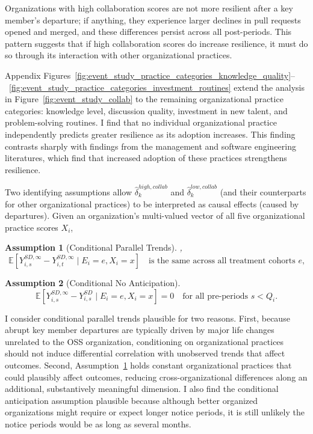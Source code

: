 \documentclass[12pt,notitlepage]{article}
\newcommand{\E}{\mathbb{E}}
\newtheorem{assumption}{Assumption}
\begin{document}
Organizations with high collaboration scores are not more resilient after a key member’s departure; if anything, they experience larger declines in pull requests opened and merged, and these differences persist across all post-periods.
This pattern suggests that if high collaboration scores do increase resilience, it must do so through its interaction with other organizational practices. 

Appendix Figures~\ref{fig:event_study_practice_categories_knowledge_quality}--~\ref{fig:event_study_practice_categories_investment_routines} extend the analysis in Figure~\ref{fig:event_study_collab} to the remaining organizational practice categories: knowledge level, discussion quality, investment in new talent, and problem-solving routines. 
I find that no individual organizational practice independently predicts greater resilience as its adoption increases.
This finding contrasts sharply with findings from the management and software engineering literatures, which find that increased adoption of these practices strengthens resilience.

Two identifying assumptions allow $\hat{\delta}_k^{high,collab}$ and $\hat{\delta}_k^{low,collab}$ (and their counterparts for other organizational practices) to be interpreted as causal effects (caused by departures).  
Given an organization's multi-valued vector of all five organizational practice scores $X_i$, 
\begin{assumption}[Conditional Parallel Trends]\label{ass:parallel_trends_cond}
, 
\[
\E[Y_{i,s}^{SD,\infty} - Y_{i,t}^{SD,\infty} \mid E_i = e, X_i = x] 
\quad \text{is the same across all treatment cohorts $e$,}
\]
\end{assumption}
\begin{assumption}[Conditional No Anticipation]\label{ass:no_ant_cond}
\[
\E[Y_{i,s}^{SD,\infty} - Y_{i,s}^{SD}\mid E_i = e, X_i = x]  = 0
\quad \text{for all pre-periods $s < Q_i$.}
\]
\end{assumption}

I consider conditional parallel trends plausible for two reasons.
First, because abrupt key member departures are typically driven by major life changes unrelated to the OSS organization, conditioning on organizational practices should not induce differential correlation with unobserved trends that affect outcomes.
Second, Assumption~\ref{ass:parallel_trends_cond} holds constant organizational practices that could plausibly affect outcomes, reducing cross-organizational differences along an additional, substantively meaningful dimension.
I also find the conditional anticipation assumption plausible because although better organized organizations might require or expect longer notice periods, it is still unlikely the notice periods would be as long as several months. 
\end{document}
